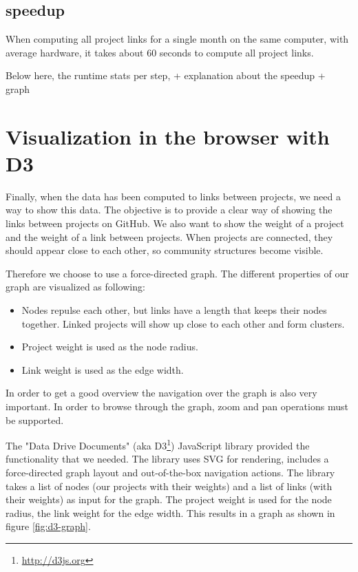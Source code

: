 \documentclass[10pt,a4paper]{article}
\begin{document}
\subsection{speedup}

When computing all project links for a single month on the same computer, with average hardware, it takes about 60 seconds to compute all project links. 

Below here, the runtime stats per step, + explanation about the speedup + graph


\section{Visualization in the browser with D3}\label{sec:visualization}

Finally, when the data has been computed to links between projects, we need a way to show this data. The objective is to provide a clear way of showing the links between projects on GitHub. We also want to show the weight of a project and the weight of a link between projects. When projects are connected, they should appear close to each other, so community structures become visible.

Therefore we choose to use a force-directed graph. The different properties of our graph are visualized as following:
\begin{itemize}
    \item Nodes repulse each other, but links have a length that keeps their nodes together. Linked projects will show up close to each other and form clusters.
    \item Project weight is used as the node radius.
    \item Link weight is used as the edge width.
\end{itemize}
In order to get a good overview the navigation over the graph is also very important. In order to browse through the graph, zoom and pan operations must be supported.

The "Data Drive Documents" (aka D3\footnote{\url{http://d3js.org}}) JavaScript library provided the functionality that we needed. The library uses SVG for rendering, includes a force-directed graph layout and out-of-the-box navigation actions. The library takes a list of nodes (our projects with their weights) and a list of links (with their weights) as input for the graph. The project weight is used for the node radius, the link weight for the edge width. This results in a graph as shown in figure \ref{fig:d3-graph}.
\end{document}
